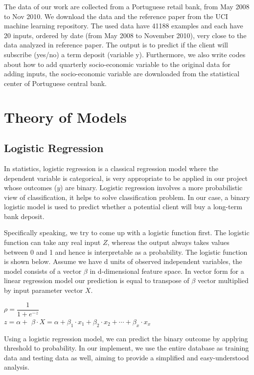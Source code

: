 \documentclass[12pt, a4paper, bibliography=totoc, english]{scrartcl}
\begin{document}
	The data of our work are collected from a Portuguese retail bank, from May 2008 to Nov 2010. We download the data and the reference paper from the UCI machine learning repository. The used data have 41188 examples and each have 20 inputs, ordered by date (from May 2008 to November 2010), very close to the data analyzed in reference paper. The output is to predict if the client will subscribe (yes/no) a term deposit (variable y). Furthermore, we also write codes about how to add quarterly socio-economic variable to the original data for adding inputs, the socio-economic variable are downloaded from the statistical center of Portuguese central bank.
	
	\section{Theory of Models}\label{Th}
	\subsection{Logistic Regression}
	In statistics, logistic regression is a classical regression model where the dependent variable is categorical, is very appropriate to be applied in our project whose outcomes ($y$) are binary. Logistic regression involves a more probabilistic view of classification, it helps to solve classification problem. In our case, a binary logistic model is used to predict whether a potential client will buy a long-term bank deposit.
	
	Specifically speaking, we try to come up with a logistic function first. The logistic function can take any real input $Z$, whereas the output always takes values between 0 and 1 and hence is interpretable as a probability. The logistic function is shown below. Assume we have d units of observed independent variables, the model consists of a vector $\beta$ in d-dimensional feature space. In vector form for a linear regression model our prediction is equal to transpose of $\beta$ vector multiplied by input parameter vector $X$.
	\begin{center}
		$\rho=\dfrac{1}{1+e^{-z}}$\vspace{3mm}
		\\
		$z=\alpha+$ $\beta{\cdot}X$$=\alpha+\beta_1{\cdot}x_1+\beta_2{\cdot}x_2+\cdots+\beta_x{\cdot}x_x$\vspace{3mm}
	\end{center}
	Using a logistic regression model, we can predict the binary outcome by applying threshold to probability. In our implement, we use the entire database as training data and testing data as well, aiming to provide a simplified and easy-understood analysis.
	
\end{document}
